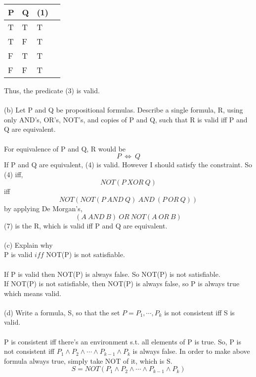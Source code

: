 \documentclass{article}
\begin{document}
\begin{table}[h]
    \begin{tabular}{llll}
    P & Q & (1) &  \\ \hline
    T & T & T   &  \\
    T & F & T   &  \\
    F & T & T   &  \\
    F & F & T   & 
    \end{tabular}
\end{table}
Thus, the predicate (3) is valid. \\
\\
(b) Let P and Q be propositional formulas. Describe a single formula, R, using only AND's, OR's, NOT's,
and copies of P and Q, such that R is valid iff P and Q are equivalent. \\
\\
For equivalence of P and Q, R would be
\begin{equation}
    P\ \Leftrightarrow \ Q
\end{equation}
If P and Q are equivalent, (4) is valid. However I should satisfy the constraint. So (4) iff,
\begin{equation}
    NOT(P\ XOR\ Q)
\end{equation}
iff
\begin{equation}
    NOT(NOT(P\ AND\ Q)\ AND\ (P\ OR\ Q))
\end{equation}
by applying De Morgan's,
\begin{equation}
    (A\ AND\ B)\ OR\ NOT(A\ OR\ B)
\end{equation}
(7) is the R, which is valid iff P and Q are equivalent.\\
\\
(c) Explain why\\
P is valid  $iff$  NOT(P) is not satisfiable.\\
\\
If P is valid then NOT(P) is always false. So NOT(P) is not satisfiable.\\
If NOT(P) is not satisfiable, then NOT(P) is always false, so P is always true which means valid.\\
\\
(d) Write a formula, S, so that the set $P = P_1,\cdots,P_k$ is not consistent iff S is valid.\\
\\
P is consistent iff there's an environment s.t. all elements of P is true.
So, P is not consistent iff $P_1 \land P_2 \land \cdots \land P_{k-1} \land P_k$ is always false.
In order to make above formula always true, simply take NOT of it, which is S.
\[S = NOT(P_1 \land P_2 \land \cdots \land P_{k-1} \land P_k)\]
\\
\end{document}
